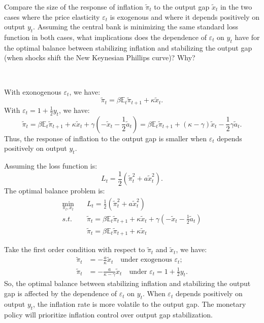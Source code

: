 \begin{problem*}[f]
    Compare the size of the response of inflation $\tilde{\pi}_t$ to the output gap $\tilde{x}_t$ 
    in the two cases where the price elasticity $\varepsilon_t$ is exogenous and where it depends positively on output $y_t$. 
    Assuming the central bank is minimizing the same standard loss function in both cases, 
    what implications does the dependence of $\varepsilon_t$ on $y_t$ have for the optimal balance 
    between stabilizing inflation and stabilizing the output gap 
    (when shocks shift the New Keynesian Phillips curve)? Why?
\end{problem*}

\begin{solution}
    \
    
    With exonogenous $\varepsilon_t$, we have:
    \[\tilde{\pi}_t = \beta \mathbb{E}_t \tilde{\pi}_{t+1} + \kappa \tilde{x}_t.\]
    With $\varepsilon_t = 1 + \frac{1}{2}y_t$, we have:
    \[\tilde{\pi}_t = \beta \mathbb{E}_t \tilde{\pi}_{t+1} + \kappa \tilde{x}_t + \gamma (-\tilde{x}_t - \frac{1}{2} \tilde{a}_t) = \beta \mathbb{E}_t\tilde{\pi}_{t+1} + (\kappa - \gamma)\tilde{x}_t -\frac{1}{2} \gamma \tilde{a}_t. \]
    Thus, the response of inflation to the output gap is smaller when $\varepsilon_t$ depends positively on output $y_t$.

    Assuming the loss function is:
    \[L_t = \frac{1}{2} \left(\tilde{\pi}_t^2 + a \tilde{x}_t^2\right).\]
    The optimal balance problem is:
    \begin{align*}
        \min_{\pi_t, x_t} &\quad L_t = \frac{1}{2} (\tilde{\pi}_t^2 + a\tilde{x}_t^2) \\
        s.t. & \quad \tilde{\pi}_t = \beta \mathbb{E}_t \tilde{\pi}_{t+1} + \kappa \tilde{x}_t + \gamma (-\tilde{x}_t - \frac{1}{2} \tilde{a}_t) \\
        & \quad \tilde{\pi}_t = \beta \mathbb{E}_t \tilde{\pi}_{t+1} + \kappa \tilde{x}_t
    \end{align*}

    Take the first order condition with respect to $\tilde{\pi}_t$ and $\tilde{x}_t$, we have:
    \begin{align*}
        \tilde{\pi}_t &= -\frac{a}{\kappa} \tilde{x}_t \quad \text{under exogenous $\varepsilon_t$}; \\
        \tilde{\pi}_t &= -\frac{a}{\kappa - \gamma} \tilde{x}_t \quad \text{under $\varepsilon_t = 1 + \frac{1}{2}y_t$}.
    \end{align*}
    So, the optimal balance between stabilizing inflation and stabilizing the output gap is affected by the dependence of $\varepsilon_t$ on $y_t$.
    When $\varepsilon_t$ depends positively on output $y_t$, the inflation rate is more volatile to the output gap. 
    The monetary policy will prioritize inflation control over output gap stabilization.
\end{solution}


